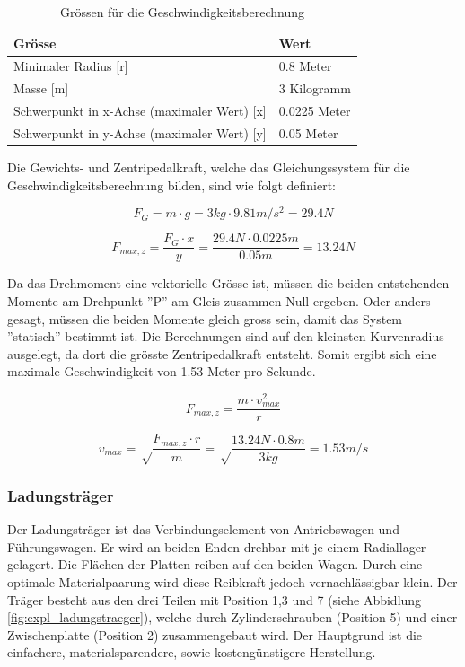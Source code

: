 \documentclass[../../main.tex]{subfiles}
\begin{document}
    \begin{table}[H] \centering
        \begin{tabular}{|l|l|}
        \hline
        \textbf{Grösse} & \textbf{Wert}\\
        \hline
        Minimaler Radius  [r]                               & 0.8 Meter\\
         \hline
        Masse [m]                                           & 3 Kilogramm\\
        \hline
        Schwerpunkt in x-Achse (maximaler Wert) [x]         & 0.0225 Meter\\
        \hline
        Schwerpunkt in y-Achse (maximaler Wert) [y]         & 0.05 Meter\\
        \hline
        \end{tabular}

        \caption{Grössen für die Geschwindigkeitsberechnung}
        \label{tab:geschwindigkeitsberechnung}
        \end{table}

    Die Gewichts- und Zentripedalkraft, welche das Gleichungssystem für die Geschwindigkeitsberechnung bilden, sind wie folgt definiert:

    $$F_{G}=m \cdot g=3kg \cdot 9.81m/s^2=29.4N$$

    $$F_{max, z}=\frac{F_{G} \cdot x}{y}=\frac{29.4N \cdot 0.0225m}{0.05m}=13.24N$$
    \newpage

    Da das Drehmoment eine vektorielle Grösse ist, müssen die beiden entstehenden Momente am Drehpunkt ''P'' am Gleis zusammen Null ergeben. Oder anders gesagt, müssen die beiden Momente gleich gross sein, damit das System ''statisch'' bestimmt ist. Die Berechnungen sind auf den kleinsten Kurvenradius ausgelegt, da dort die grösste Zentripedalkraft entsteht. Somit ergibt sich eine maximale Geschwindigkeit von 1.53 Meter pro Sekunde.

    $$F_{max, z}=\frac{m \cdot v_{max}^2}{r}$$

    $$v_{max}=\sqrt\frac{F_{max, z}\cdot r}{m}=\sqrt\frac{13.24N \cdot 0.8m}{3kg}=1.53m/s$$

    \subsubsection{Ladungsträger}
    Der Ladungsträger ist das Verbindungselement von Antriebswagen und Führungswagen. Er wird an beiden Enden drehbar mit je einem Radiallager gelagert. Die Flächen der Platten reiben auf den beiden Wagen. Durch eine optimale Materialpaarung wird diese Reibkraft jedoch vernachlässigbar klein. Der Träger besteht aus den drei Teilen mit Position 1,3 und 7 (siehe Abbidlung \ref{fig:expl_ladungstraeger}), welche durch Zylinderschrauben (Position 5) und einer Zwischenplatte (Position 2) zusammengebaut wird. Der Hauptgrund ist die einfachere, materialsparendere, sowie kostengünstigere Herstellung.\\
\end{document}
